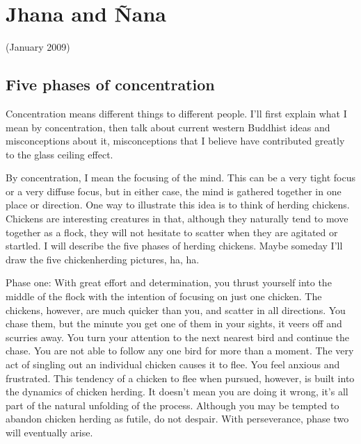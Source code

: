 \documentclass[a5paper,10pt,english]{book}
\begin{document}
\sphinxstepscope


\chapter{Jhana and Ñana}
\label{\detokenize{back-jhana-nana:jhana-and-nana}}\label{\detokenize{back-jhana-nana::doc}}
\sphinxAtStartPar
(January 2009)


\section{Five phases of concentration}
\label{\detokenize{back-jhana-nana:five-phases-of-concentration}}\label{\detokenize{back-jhana-nana:chicken-herding}}
\sphinxAtStartPar
Concentration means different things to different people. I’ll first
explain what I mean by concentration, then talk about current western
Buddhist ideas and misconceptions about it, misconceptions that I
believe have contributed greatly to the glass ceiling effect.

\sphinxAtStartPar
By concentration, I mean the focusing of the mind. This can be a very
tight focus or a very diffuse focus, but in either case, the mind is
gathered together in one place or direction. One way to illustrate this
idea is to think of herding chickens. Chickens are interesting creatures
in that, although they naturally tend to move together as a flock, they
will not hesitate to scatter when they are agitated or startled. I will
describe the five phases of herding chickens. Maybe someday I’ll draw
the five chickenherding pictures, ha, ha.

\sphinxAtStartPar
Phase one: With great effort and determination, you thrust yourself into
the middle of the flock with the intention of focusing on just one
chicken. The chickens, however, are much quicker than you, and scatter
in all directions. You chase them, but the minute you get one of them
in your sights, it veers off and scurries away. You turn your attention
to the next nearest bird and continue the chase. You are not able to
follow any one bird for more than a moment. The very act of singling out
an individual chicken causes it to flee. You feel anxious and
frustrated. This tendency of a chicken to flee when pursued, however, is
built into the dynamics of chicken herding. It doesn’t mean you are
doing it wrong, it’s all part of the natural unfolding of the process.
Although you may be tempted to abandon chicken herding as futile, do not
despair. With perseverance, phase two will eventually arise.
\end{document}
